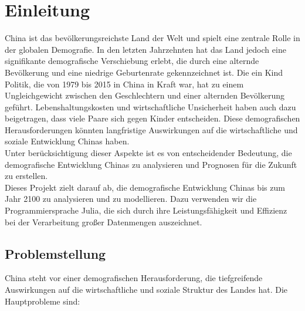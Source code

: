 
\section{Einleitung}
China ist das bevölkerungsreichste Land der Welt und spielt eine zentrale Rolle in der globalen Demografie. In den letzten Jahrzehnten hat das Land jedoch eine signifikante demografische Verschiebung erlebt, die durch eine alternde Bevölkerung und eine niedrige Geburtenrate gekennzeichnet ist. Die ein Kind Politik, die von 1979 bis 2015 in China in Kraft war, hat zu einem Ungleichgewicht zwischen den Geschlechtern und einer alternden Bevölkerung geführt. Lebenshaltungskosten und wirtschaftliche Unsicherheit haben auch dazu beigetragen, dass viele Paare sich gegen Kinder entscheiden. Diese demografischen Herausforderungen könnten langfristige Auswirkungen auf die wirtschaftliche und soziale Entwicklung Chinas haben.\\  

Unter berücksichtigung dieser Aspekte ist es von entscheidender Bedeutung, die demografische Entwicklung Chinas zu analysieren und Prognosen für die Zukunft zu erstellen.\\

Dieses Projekt zielt darauf ab, die demografische Entwicklung Chinas bis zum Jahr 2100 zu analysieren und zu modellieren. Dazu verwenden wir die Programmiersprache Julia, die sich durch ihre Leistungsfähigkeit und Effizienz bei der Verarbeitung großer Datenmengen auszeichnet. 
\\


\subsection{Problemstellung}
China steht vor einer demografischen Herausforderung, die tiefgreifende Auswirkungen auf die wirtschaftliche und soziale Struktur des Landes hat. Die Hauptprobleme sind:


